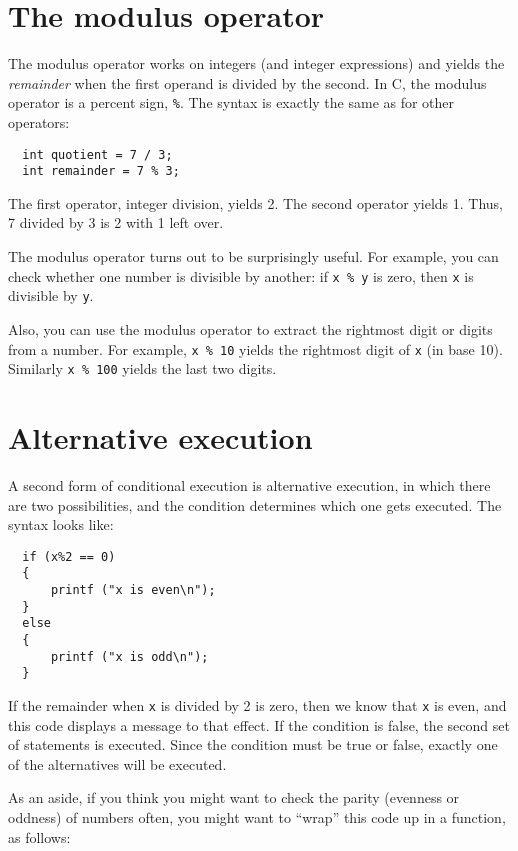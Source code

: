 \section{The modulus operator}

The modulus operator works on integers (and integer expressions)
and yields the {\em remainder} when the first operand is divided
by the second.  In C, the modulus operator is a percent sign,
{\tt \%}.  The syntax is exactly the same as for other operators:

\begin{verbatim}
  int quotient = 7 / 3;
  int remainder = 7 % 3;
\end{verbatim}
%
The first operator, integer division, yields 2.  The second
operator yields 1.  Thus, 7 divided by 3 is 2 with 1 left over.

The modulus operator turns out to be surprisingly useful.  For
example, you can check whether one number is divisible by
another: if {\tt x \% y} is zero, then {\tt x} is divisible
by {\tt y}.

Also, you can use the modulus operator to extract the rightmost
digit or digits from a number.  For example, {\tt x \% 10} yields
the rightmost digit of {\tt x} (in base 10).  Similarly
{\tt x \% 100} yields the last two digits.

\section {Alternative execution}
\label{alternative}

A second form of conditional execution is alternative execution,
in which there are two possibilities, and the condition determines
which one gets executed.  The syntax looks like:

\begin{verbatim}
  if (x%2 == 0)
  {
      printf ("x is even\n");
  } 
  else 
  {
      printf ("x is odd\n");
  }
\end{verbatim}
%
If the remainder when {\tt x} is divided by 2 is zero, then
we know that {\tt x} is even, and this code displays a message
to that effect.  If the condition is false, the second
set of statements is executed.  Since the condition must
be true or false, exactly one of the alternatives will be
executed.

As an aside, if you think you might want to check the parity
(evenness or oddness) of numbers often, you might want to
``wrap'' this code up in a function, as follows:

